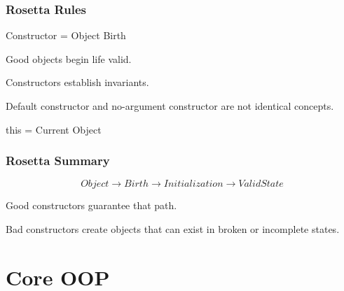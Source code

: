 \documentclass[11pt,a4paper]{book}
\begin{document}

\section{Rosetta Rules}

\begin{rosettarule}

Constructor
=
Object Birth

\end{rosettarule}

\begin{rosettarule}

Good objects begin life valid.

\end{rosettarule}

\begin{rosettarule}

Constructors establish invariants.

\end{rosettarule}

\begin{rosettarule}

Default constructor
and
no-argument constructor
are not identical concepts.

\end{rosettarule}

\begin{rosettarule}

this
=
Current Object

\end{rosettarule}


\section{Rosetta Summary}

\[
Object
\rightarrow
Birth
\rightarrow
Initialization
\rightarrow
Valid State
\]

Good constructors guarantee that path.

Bad constructors create objects that can exist
in broken or incomplete states.


\part{Core OOP}
\end{document}

